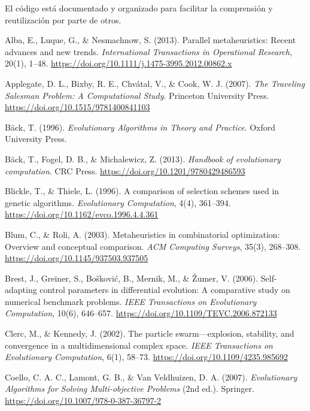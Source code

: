 \documentclass[10pt,a4paper]{article}
\begin{document}
\begin{multicols}{2}
El código está documentado y organizado para facilitar la comprensión y reutilización por parte de otros.



\begin{thebibliography}{99}

Alba, E., Luque, G., \& Nesmachnow, S. (2013). Parallel metaheuristics: Recent advances and new trends. \textit{International Transactions in Operational Research}, 20(1), 1–48. \url{https://doi.org/10.1111/j.1475-3995.2012.00862.x}

Applegate, D. L., Bixby, R. E., Chvátal, V., \& Cook, W. J. (2007). \textit{The Traveling Salesman Problem: A Computational Study}. Princeton University Press. \url{https://doi.org/10.1515/9781400841103}

Bäck, T. (1996). \textit{Evolutionary Algorithms in Theory and Practice}. Oxford University Press.

Bäck, T., Fogel, D. B., \& Michalewicz, Z. (2013). \textit{Handbook of evolutionary computation}. CRC Press. \url{https://doi.org/10.1201/9780429486593}

Blickle, T., \& Thiele, L. (1996). A comparison of selection schemes used in genetic algorithms. \textit{Evolutionary Computation}, 4(4), 361–394. \url{https://doi.org/10.1162/evco.1996.4.4.361}

Blum, C., \& Roli, A. (2003). Metaheuristics in combinatorial optimization: Overview and conceptual comparison. \textit{ACM Computing Surveys}, 35(3), 268–308. \url{https://doi.org/10.1145/937503.937505}

Brest, J., Greiner, S., Bošković, B., Mernik, M., \& Žumer, V. (2006). Self-adapting control parameters in differential evolution: A comparative study on numerical benchmark problems. \textit{IEEE Transactions on Evolutionary Computation}, 10(6), 646–657. \url{https://doi.org/10.1109/TEVC.2006.872133}

Clerc, M., \& Kennedy, J. (2002). The particle swarm—explosion, stability, and convergence in a multidimensional complex space. \textit{IEEE Transactions on Evolutionary Computation}, 6(1), 58–73. \url{https://doi.org/10.1109/4235.985692}

Coello, C. A. C., Lamont, G. B., \& Van Veldhuizen, D. A. (2007). \textit{Evolutionary Algorithms for Solving Multi-objective Problems} (2nd ed.). Springer. \url{https://doi.org/10.1007/978-0-387-36797-2}


\end{thebibliography}
\end{multicols}
\end{document}
